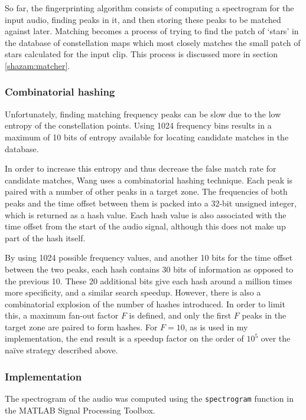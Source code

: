 \documentclass[12pt,a4paper,twoside,openright]{report}
\begin{document}
So far, the fingerprinting algorithm consists of computing a spectrogram for the input audio, finding peaks in it, and then storing these peaks to be matched against later. Matching becomes a process of trying to find the patch of `stars' in the database of constellation maps which most closely matches the small patch of stars calculated for the input clip. This process is discussed more in section \ref{shazam:matcher}.

\subsubsection{Combinatorial hashing}

Unfortunately, finding matching frequency peaks can be slow due to the low entropy of the constellation points. Using 1024 frequency bins results in a maximum of 10 bits of entropy available for locating candidate matches in the database. 

In order to increase this entropy and thus decrease the false match rate for candidate matches, Wang uses a combinatorial hashing technique. Each peak is paired with a number of other peaks in a target zone. The frequencies of both peaks and the time offset between them is packed into a 32-bit unsigned integer, which is returned as a hash value. Each hash value is also associated with the time offset from the start of the audio signal, although this does not make up part of the hash itself.

By using 1024 possible frequency values, and another 10 bits for the time offset between the two peaks, each hash contains 30 bits of information as opposed to the previous 10. These 20 additional bits give each hash around a million times more specificity, and a similar search speedup. However, there is also a combinatorial explosion of the number of hashes introduced. In order to limit this, a maximum fan-out factor $F$ is defined, and only the first $F$ peaks in the target zone are paired to form hashes. For $F=10$, as is used in my implementation, the end result is a speedup factor on the order of $10^5$ over the na{\"i}ve strategy described above.

\subsubsection{Implementation}

The spectrogram of the audio was computed using the \lstinline{spectrogram} function in the MATLAB Signal Processing Toolbox.
\end{document}
